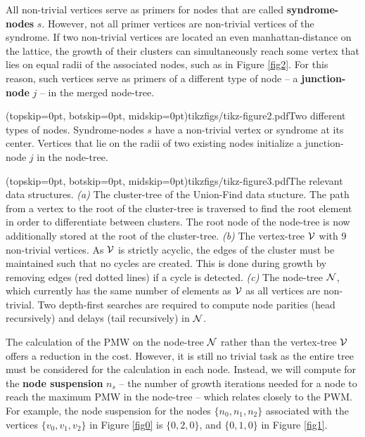 All non-trivial vertices serve as primers for nodes that are called \textbf{syndrome-nodes} $s$. However, not all primer vertices are non-trivial vertices of the syndrome. If two non-trivial vertices are located an even manhattan-distance on the lattice, the growth of their clusters can simultaneously reach some vertex that lies on equal radii of the associated nodes, such as in Figure \ref{fig2}. For this reason, such vertices serve as primers of a different type of node -- a \textbf{junction-node} $j$ -- in the merged node-tree. 

\Figure[htb](topskip=0pt, botskip=0pt, midskip=0pt){tikzfigs/tikz-figure2.pdf}{Two different types of nodes. Syndrome-nodes $s$ have a non-trivial vertex or syndrome at its center. Vertices that lie on the radii of two existing nodes initialize a junction-node $j$ in the node-tree.\label{fig2}}

\Figure[hbt](topskip=0pt, botskip=0pt, midskip=0pt){tikzfigs/tikz-figure3.pdf}{The relevant data structures. \emph{(a)} The cluster-tree of the Union-Find data stucture. The path from a vertex to the root of the cluster-tree is traversed to find the root element in order to differentiate between clusters. The root node of the node-tree is now additionally stored at the root of the cluster-tree. \emph{(b)} The vertex-tree $\mathcal{V}$ with 9 non-trivial vertices. As $\mathcal{V}$ is strictly acyclic, the edges of the cluster must be maintained such that no cycles are created. This is done during growth by removing edges (red dotted lines) if a cycle is detected. \emph{(c)} The node-tree $\mathcal{N}$, which currently has the same number of elements as $\mathcal{V}$ as all vertices are non-trivial. Two depth-first searches are required to compute node parities (head recursively) and delays (tail recursively) in $\mathcal{N}$.\label{fig3}}

The calculation of the PMW on the node-tree $\mathcal{N}$ rather than the vertex-tree $\mathcal{V}$ offers a reduction in the cost. However, it is still no trivial task as the entire tree must be considered for the calculation in each node. Instead, we will compute for the \textbf{node suspension} $n_s$ -- the number of growth iterations needed for a node to reach the maximum PMW in the node-tree -- which relates closely to the PWM. For example, the node suspension for the nodes $\{n_0, n_1, n_2\}$ associated with the vertices $\{v_0, v_1, v_2\}$ in Figure \ref{fig0} is $\{0, 2, 0\}$, and $\{0, 1, 0\}$ in Figure \ref{fig1}.

